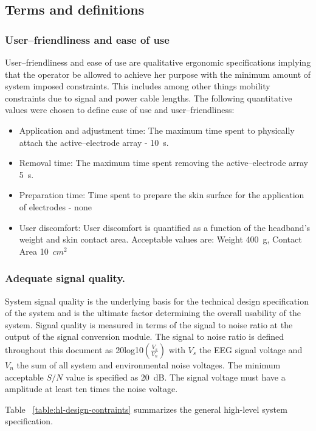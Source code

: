 \subsection{Terms and definitions}
\subsubsection{User--friendliness and ease of use}
User--friendliness and ease of use are qualitative ergonomic
specifications implying that the operator be allowed to achieve her
purpose with the minimum amount of system imposed constraints. This
includes among other things mobility constraints due to signal and
power cable lengths. The following quantitative values were chosen to
define ease of use and user--friendliness:

\begin{itemize}
	\item{Application and adjustment time: The maximum time spent to
	physically attach the active--electrode array - 10~s.}
	\item{Removal time: The maximum time spent removing the
	active--electrode array 5~s.}
	\item{Preparation time: Time spent to prepare the skin surface for
	the application of electrodes - none}
	\item{User discomfort: User discomfort is quantified as a function of
	the headband's weight and skin contact area. Acceptable values
	are: Weight 400~g, Contact Area 10~$cm^{2}$}
\end{itemize}

\subsubsection{Adequate signal quality.}
System signal quality is the underlying basis for the technical design
specification of the system and is the ultimate factor determining the
overall usability of the system. Signal quality is measured in terms
of the signal to noise ratio at the output of the signal conversion
module. The signal to noise ratio is defined throughout this document
as 20log10$(\frac{V_{s}}{V_{n}})$ with $V_{s}$ the EEG signal voltage
and $V_{n}$ the sum of all system and environmental noise
voltages. The minimum acceptable $S/N$ value is specified as
20~dB. The signal voltage must have a amplitude at least ten times the
noise voltage.

Table ~\vref{table:hl-design-contraints} summarizes the general
high-level system specification. 

